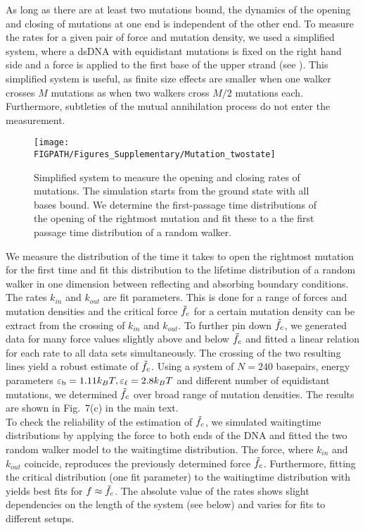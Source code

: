 As long as there are at least two mutations bound, the dynamics of the opening and closing of mutations at one end is independent of the other end. To measure the rates for a given pair of force and mutation density, we used a simplified system,
where a dsDNA with equidistant mutations is fixed on the right hand side
and a force is applied to the first base of the upper strand 
(see ). This simplified system is useful, as finite size effects are smaller when one walker crosses $M$ mutations as when two walkers cross $M/2$ mutations each. Furthermore, subtleties of the mutual annihilation process do not enter the measurement.
\begin{figure}
\centering
\texttt{[image: \\FIGPATH/Figures\_Supplementary/Mutation\_twostate]}
\caption[Supp.: Measuring rates of mutation opening and closing.]
{\label{fig:measuringrates}Simplified system to measure the opening
and closing rates of mutations. The simulation starts from the ground state
with all bases bound. We determine the first-passage time distributions
of the opening of the rightmost mutation and fit these to a the first passage
time distribution of a random walker.}
\end{figure}
We measure the distribution of the time it takes to open the rightmost mutation for the first time and fit this distribution to the lifetime distribution of a random walker in one dimension between reflecting and absorbing boundary conditions. The rates $k_{in}$ and $k_{out}$ are fit parameters. This is done for a range of forces and mutation densities and the critical force $\tilde{f}_c$ for a certain mutation density can be extract from the crossing of $k_{in}$ and $k_{out}$. To further pin down $\tilde{f}_c$, we generated data for many force values slightly above and below $\tilde{f}_c$ and fitted a linear relation for each rate to all data sets simultaneously. The crossing of the two resulting lines yield a robust estimate of $\tilde{f}_c$. 
Using a system of $N=240$ basepairs, energy parameters ${\varepsilon_{\rm b}}=1.11k_BT, {\varepsilon_{\ell}}=2.8k_BT$ and different number of equidistant mutations, we determined $\tilde{f}_c$ over broad range of mutation densities. The results are shown in Fig.~7(c) in the main text. \\
To check the reliability of the estimation of $\tilde{f}_c$, we simulated waitingtime distributions by applying the force to both ends of the DNA and fitted the two random walker model to the waitingtime distribution. The force, where $k_{in}$ and $k_{out}$ coincide, reproduces the previously determined force $\tilde{f}_c$. Furthermore, fitting the critical distribution (one fit parameter)  to the waitingtime distribution with yields best fits for $f\approx \tilde{f}_c$. The absolute value of the rates shows slight dependencies on the length of the system (see below) and varies for fits to different setups. \\

